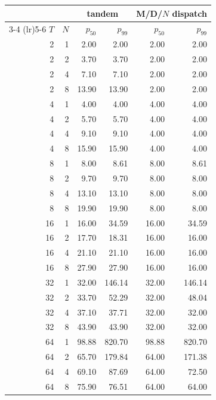 \documentclass[11pt]{article}
\begin{document}
\begin{table}[H]
\centering
\small
\begin{tabular}{@{}rr rr rr@{}}
\toprule
 & & \multicolumn{2}{c}{tandem} & \multicolumn{2}{c}{M/D/$N$ dispatch} \\
\cmidrule(lr){3-4} \cmidrule(lr){5-6}
$T$ & $N$ & $p_{50}$ & $p_{99}$ & $p_{50}$ & $p_{99}$ \\
\midrule
 2 & 1 &    2.00 &    2.00 &    2.00 &    2.00 \\
 2 & 2 &    3.70 &    3.70 &    2.00 &    2.00 \\
 2 & 4 &    7.10 &    7.10 &    2.00 &    2.00 \\
 2 & 8 &   13.90 &   13.90 &    2.00 &    2.00 \\
\midrule
 4 & 1 &    4.00 &    4.00 &    4.00 &    4.00 \\
 4 & 2 &    5.70 &    5.70 &    4.00 &    4.00 \\
 4 & 4 &    9.10 &    9.10 &    4.00 &    4.00 \\
 4 & 8 &   15.90 &   15.90 &    4.00 &    4.00 \\
\midrule
 8 & 1 &    8.00 &    8.61 &    8.00 &    8.61 \\
 8 & 2 &    9.70 &    9.70 &    8.00 &    8.00 \\
 8 & 4 &   13.10 &   13.10 &    8.00 &    8.00 \\
 8 & 8 &   19.90 &   19.90 &    8.00 &    8.00 \\
\midrule
16 & 1 &   16.00 &   34.59 &   16.00 &   34.59 \\
16 & 2 &   17.70 &   18.31 &   16.00 &   16.00 \\
16 & 4 &   21.10 &   21.10 &   16.00 &   16.00 \\
16 & 8 &   27.90 &   27.90 &   16.00 &   16.00 \\
\midrule
32 & 1 &   32.00 &  146.14 &   32.00 &  146.14 \\
32 & 2 &   33.70 &   52.29 &   32.00 &   48.04 \\
32 & 4 &   37.10 &   37.71 &   32.00 &   32.00 \\
32 & 8 &   43.90 &   43.90 &   32.00 &   32.00 \\
\midrule
64 & 1 &   98.88 &  820.70 &   98.88 &  820.70 \\
64 & 2 &   65.70 &  179.84 &   64.00 &  171.38 \\
64 & 4 &   69.10 &   87.69 &   64.00 &   72.50 \\
64 & 8 &   75.90 &   76.51 &   64.00 &   64.00 \\

\end{tabular}
\end{table}
\end{document}
